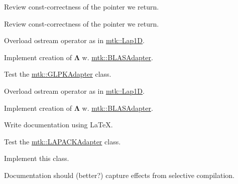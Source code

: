 \begin{DoxyRefList}
\item[\label{todo__todo000014}%
\hypertarget{todo__todo000014}{}%
Member \hyperlink{classmtk_1_1UniStgGrid3D_abf4aba911a3f0654e1852cdc9deb7fd7}{mtk\+:\+:Uni\+Stg\+Grid3\+D\+:\+:discrete\+\_\+domain\+\_\+y} () const ]Review const-\/correctness of the pointer we return.  
\item[\label{todo__todo000015}%
\hypertarget{todo__todo000015}{}%
Member \hyperlink{classmtk_1_1UniStgGrid3D_ac98305ff4a6f6d9c8cc49b4c0377547f}{mtk\+:\+:Uni\+Stg\+Grid3\+D\+:\+:discrete\+\_\+domain\+\_\+z} () const ]Review const-\/correctness of the pointer we return.  
\item[\label{todo__todo000019}%
\hypertarget{todo__todo000019}{}%
File \hyperlink{mtk__div__1d_8cc}{mtk\+\_\+div\+\_\+1d.cc} ]Overload ostream operator as in \hyperlink{classmtk_1_1Lap1D}{mtk\+::\+Lap1\+D}.

Implement creation of $ \mathbf{\Lambda}$ w. \hyperlink{classmtk_1_1BLASAdapter}{mtk\+::\+B\+L\+A\+S\+Adapter}.  
\item[\label{todo__todo000031}%
\hypertarget{todo__todo000031}{}%
File \hyperlink{mtk__glpk__adapter__test_8cc}{mtk\+\_\+glpk\+\_\+adapter\+\_\+test.cc} ]Test the \hyperlink{classmtk_1_1GLPKAdapter}{mtk\+::\+G\+L\+P\+K\+Adapter} class.  
\item[\label{todo__todo000021}%
\hypertarget{todo__todo000021}{}%
File \hyperlink{mtk__grad__1d_8cc}{mtk\+\_\+grad\+\_\+1d.cc} ]Overload ostream operator as in \hyperlink{classmtk_1_1Lap1D}{mtk\+::\+Lap1\+D}.

Implement creation of $ \mathbf{\Lambda}$ w. \hyperlink{classmtk_1_1BLASAdapter}{mtk\+::\+B\+L\+A\+S\+Adapter}.  
\item[\label{todo__todo000023}%
\hypertarget{todo__todo000023}{}%
File \hyperlink{mtk__lapack__adapter_8cc}{mtk\+\_\+lapack\+\_\+adapter.cc} ]Write documentation using La\+Te\+X. 
\item[\label{todo__todo000032}%
\hypertarget{todo__todo000032}{}%
File \hyperlink{mtk__lapack__adapter__test_8cc}{mtk\+\_\+lapack\+\_\+adapter\+\_\+test.cc} ]Test the \hyperlink{classmtk_1_1LAPACKAdapter}{mtk\+::\+L\+A\+P\+A\+C\+K\+Adapter} class.  
\item[\label{todo__todo000003}%
\hypertarget{todo__todo000003}{}%
File \hyperlink{mtk__quad__1d_8h}{mtk\+\_\+quad\+\_\+1d.h} ]Implement this class.  
\item[\label{todo__todo000004}%
\hypertarget{todo__todo000004}{}%
File \hyperlink{mtk__roots_8h}{mtk\+\_\+roots.h} ]Documentation should (better?) capture effects from selective compilation.


\end{DoxyRefList}
